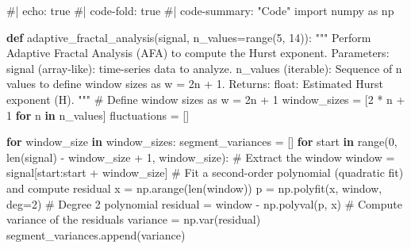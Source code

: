 \documentclass[
  sn-vancouver,
  Numbered,
  referee,
  lineno]{sn-jnl}
\newenvironment{Shaded}{\begin{snugshade}}{\end{snugshade}}
\newcommand{\BuiltInTok}[1]{\textcolor[rgb]{0.00,0.23,0.31}{#1}}
\newcommand{\CommentTok}[1]{\textcolor[rgb]{0.37,0.37,0.37}{#1}}
\newcommand{\ControlFlowTok}[1]{\textcolor[rgb]{0.00,0.23,0.31}{\textbf{#1}}}
\newcommand{\DecValTok}[1]{\textcolor[rgb]{0.68,0.00,0.00}{#1}}
\newcommand{\ImportTok}[1]{\textcolor[rgb]{0.00,0.46,0.62}{#1}}
\newcommand{\KeywordTok}[1]{\textcolor[rgb]{0.00,0.23,0.31}{\textbf{#1}}}
\newcommand{\NormalTok}[1]{\textcolor[rgb]{0.00,0.23,0.31}{#1}}
\newcommand{\OperatorTok}[1]{\textcolor[rgb]{0.37,0.37,0.37}{#1}}
\begin{document}
\begin{Shaded}
\begin{Highlighting}[]
\CommentTok{\#| echo: true}
\CommentTok{\#| code{-}fold: true}
\CommentTok{\#| code{-}summary: "Code"}
\ImportTok{import}\NormalTok{ numpy }\ImportTok{as}\NormalTok{ np}

\KeywordTok{def}\NormalTok{ adaptive\_fractal\_analysis(signal, n\_values}\OperatorTok{=}\BuiltInTok{range}\NormalTok{(}\DecValTok{5}\NormalTok{, }\DecValTok{14}\NormalTok{)):}
    \CommentTok{"""}
\CommentTok{    Perform Adaptive Fractal Analysis (AFA) to compute the Hurst exponent.}
\CommentTok{    }
\CommentTok{    Parameters:}
\CommentTok{        signal (array{-}like): time{-}series data to analyze.}
\CommentTok{        n\_values (iterable): Sequence of \textasciigrave{}n\textasciigrave{} values to define window sizes as w = 2n + 1.}
\CommentTok{    }
\CommentTok{    Returns:}
\CommentTok{        float: Estimated Hurst exponent (H).}
\CommentTok{    """}
    \CommentTok{\# Define window sizes as w = 2n + 1}
\NormalTok{    window\_sizes }\OperatorTok{=}\NormalTok{ [}\DecValTok{2} \OperatorTok{*}\NormalTok{ n }\OperatorTok{+} \DecValTok{1} \ControlFlowTok{for}\NormalTok{ n }\KeywordTok{in}\NormalTok{ n\_values]}
\NormalTok{    fluctuations }\OperatorTok{=}\NormalTok{ []}

    \ControlFlowTok{for}\NormalTok{ window\_size }\KeywordTok{in}\NormalTok{ window\_sizes:}
\NormalTok{        segment\_variances }\OperatorTok{=}\NormalTok{ []}
        \ControlFlowTok{for}\NormalTok{ start }\KeywordTok{in} \BuiltInTok{range}\NormalTok{(}\DecValTok{0}\NormalTok{, }\BuiltInTok{len}\NormalTok{(signal) }\OperatorTok{{-}}\NormalTok{ window\_size }\OperatorTok{+} \DecValTok{1}\NormalTok{, window\_size):}
            \CommentTok{\# Extract the window}
\NormalTok{            window }\OperatorTok{=}\NormalTok{ signal[start:start }\OperatorTok{+}\NormalTok{ window\_size]}
            \CommentTok{\# Fit a second{-}order polynomial (quadratic fit) and compute residual}
\NormalTok{            x }\OperatorTok{=}\NormalTok{ np.arange(}\BuiltInTok{len}\NormalTok{(window))}
\NormalTok{            p }\OperatorTok{=}\NormalTok{ np.polyfit(x, window, deg}\OperatorTok{=}\DecValTok{2}\NormalTok{)  }\CommentTok{\# Degree 2 polynomial}
\NormalTok{            residual }\OperatorTok{=}\NormalTok{ window }\OperatorTok{{-}}\NormalTok{ np.polyval(p, x)}
            \CommentTok{\# Compute variance of the residuals}
\NormalTok{            variance }\OperatorTok{=}\NormalTok{ np.var(residual)}
\NormalTok{            segment\_variances.append(variance)}
        

\end{Highlighting}
\end{Shaded}
\end{document}
